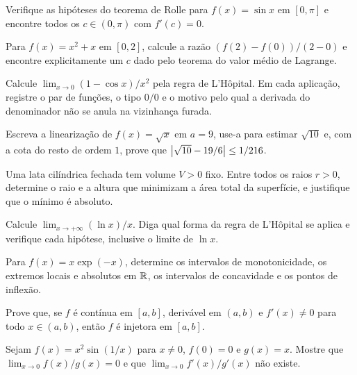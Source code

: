 \documentclass[11pt,a4paper]{article}
\begin{document}
\begin{exercicio}
Verifique as hipóteses do teorema de Rolle para $f(x)=\sin x$ em $[0,\pi]$ e encontre todos os $c\in(0,\pi)$ com $f'(c)=0$.
\end{exercicio}

\begin{exercicio}
Para $f(x)=x^2+x$ em $[0,2]$, calcule a razão $(f(2)-f(0))/(2-0)$ e encontre explicitamente um $c$ dado pelo teorema do valor médio de Lagrange.
\end{exercicio}

\begin{exercicio}
Calcule $\lim_{x\to 0}(1-\cos x)/x^2$ pela regra de L'Hôpital. Em cada aplicação, registre o par de funções, o tipo $0/0$ e o motivo pelo qual a derivada do denominador não se anula na vizinhança furada.
\end{exercicio}

\begin{exercicio}
Escreva a linearização de $f(x)=\sqrt{x}$ em $a=9$, use-a para estimar $\sqrt{10}$ e, com a cota do resto de ordem $1$, prove que $\left\lvert \sqrt{10}-19/6 \right\rvert\le 1/216$.
\end{exercicio}

\begin{exercicio}
Uma lata cilíndrica fechada tem volume $V>0$ fixo. Entre todos os raios $r>0$, determine o raio e a altura que minimizam a área total da superfície, e justifique que o mínimo é absoluto.
\end{exercicio}

\begin{exercicio}
Calcule $\lim_{x\to+\infty}(\ln x)/x$. Diga qual forma da regra de L'Hôpital se aplica e verifique cada hipótese, inclusive o limite de $\ln x$.
\end{exercicio}

\begin{exercicio}
Para $f(x)=x\exp(-x)$, determine os intervalos de monotonicidade, os extremos locais e absolutos em $\mathbb{R}$, os intervalos de concavidade e os pontos de inflexão.
\end{exercicio}

\begin{exercicio}
Prove que, se $f$ é contínua em $[a,b]$, derivável em $(a,b)$ e $f'(x)\neq 0$ para todo $x\in(a,b)$, então $f$ é injetora em $[a,b]$.
\end{exercicio}

\begin{exercicio}
Sejam $f(x)=x^2\sin(1/x)$ para $x\neq 0$, $f(0)=0$ e $g(x)=x$. Mostre que $\lim_{x\to 0}f(x)/g(x)=0$ e que $\lim_{x\to 0}f'(x)/g'(x)$ não existe.
\end{exercicio}
\end{document}
